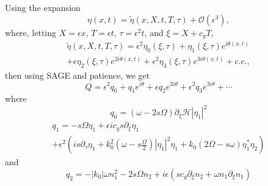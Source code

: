 \documentclass[a4paper,11pt]{article}
\newcommand{\p}{\partial}
\begin{document}
Using the expansion
\[
\eta(x,t) = \tilde{\eta}(x,X,t,T,\tau) + \mathcal{O}(\epsilon^{3}),
\]
where, letting $X=\epsilon x$, $T=\epsilon t$, $\tau = \epsilon^{2}t$, and $\xi = X + c_{g}T$, 
\begin{multline}
\tilde{\eta}(x,X,t,T,\tau) = \epsilon^{2}\eta_{0}(\xi,\tau) + \eta_{1}(\xi,\tau)e^{i\theta(x,t)} \\
+ \epsilon \eta_{2}(\xi,\tau)e^{2i\theta(x,t)}  + \epsilon^{2}\eta_{3}(\xi,\tau)e^{3i\theta(x,t)} + \mbox{c.c.},
\label{nlssurfexpan}
\end{multline}
then using SAGE and patience, we get 
\[
Q = \epsilon^{2}q_{0} + q_{1}e^{i\theta} + \epsilon q_{2}e^{2i\theta} + \epsilon^{2}q_{3}e^{3i\theta} + \cdots
\]
where
\[
q_{0} = (\omega - 2s\Omega)\p_{\xi}\mathcal{H}\left|\eta_{1}\right|^{2}
\]
\begin{multline*}
q_{1} = -s\Omega \eta_{1} + \epsilon ic_{g}s\p_{\xi}\eta_{1} \\
+ \epsilon^{2}\left(  is\p_{\tau}\eta_{1} + k_{0}^{2}\left(\omega-s\frac{\Omega}{2} \right)\left|\eta_{1}\right|^{2}\eta_{1} + k_{0}(2\Omega-s\omega)\eta_{1}^{\ast}\eta_{2}\right) 
\end{multline*}
and
\[
q_{2} = -\left|k_0\right| \omega n_1^2  - 2s\Omega n_2 + i\epsilon(s c_g \p_{\xi}n_2 + \omega n_1 \p_{\xi}n_1 )
\]
\end{document}
